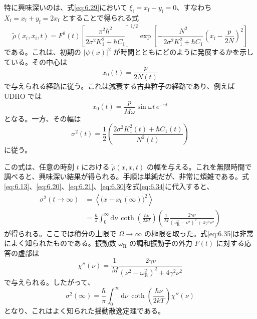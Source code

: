 特に興味深いのは、式\eqref{eq:6.29}において $\xi_{\mathrm f}=x_{\mathrm f}-y_{\mathrm f}=0$、すなわち $X_{\mathrm f}=x_{\mathrm f}+y_{\mathrm f}=2x_{\mathrm f}$ とすることで得られる式
\begin{equation}
\tilde\rho(x_{\mathrm f},x_{\mathrm f},t)
=F^2(t)\left[\frac{\pi^2\hbar^2}{2\sigma^2K_1^2+\hbar C_1}\right]^{1/2}
\exp\!\left[-\frac{N^2}{2\sigma^2K_1^2+\hbar C_1}
\left(x_{\mathrm f}-\frac p{2N}\right)^2\right]
\tag{6.31}\label{eq:6.31}
\end{equation}
である。これは、初期の $|\psi(x)|^2$ が時間とともにどのように発展するかを示している。その中心は
\begin{equation}
x_0(t)=\frac p{2N(t)}
\tag{6.32}\label{eq:6.32}
\end{equation}
で与えられる経路に従う。これは減衰する古典粒子の経路であり、例えば UDHO では
\begin{equation}
x_0(t)=\frac p{M\omega}\sin\omega t\,e^{-\gamma t}
\tag{6.33}\label{eq:6.33}
\end{equation}
となる。一方、その幅は
\begin{equation}
\sigma^2(t)=\frac12\left(\frac{2\sigma^2K_1^2(t)+\hbar C_1(t)}{N^2(t)}\right)
\tag{6.34}\label{eq:6.34}
\end{equation}
に従う。

この式は、任意の時刻 $t$ における $\tilde\rho(x,x,t)$ の幅を与える。これを無限時間で調べると、興味深い結果が得られる。手順は単純だが、非常に煩雑である。式\eqref{eq:6.13}、\eqref{eq:6.20}、\eqref{eq:6.21}、\eqref{eq:6.30}を式\eqref{eq:6.34}に代入すると、
\begin{equation}
\begin{aligned}
\sigma^2(t\to\infty)
&=\left\langle\bigl(x-x_0(\infty)\bigr)^2\right\rangle\\
&=\frac{\hbar}{\pi}\int_0^\infty\mathrm d\nu\,
\coth\!\left(\frac{\hbar\nu}{2kT}\right)
\left(\frac1M\frac{2\gamma\nu}{(\omega_{\mathrm R}^2-\nu^2)^2+4\gamma^2\nu^2}\right)
\end{aligned}
\tag{6.35}\label{eq:6.35}
\end{equation}
が得られる。ここでは積分の上限で $\Omega\to\infty$ の極限を取った。式\eqref{eq:6.35}は非常によく知られたものである。振動数 $\omega_{\mathrm R}$ の調和振動子の外力 $F(t)$ に対する応答の虚部は
\begin{equation}
\chi''(\nu)=\frac1M\frac{2\gamma\nu}{(\nu^2-\omega_{\mathrm R}^2)^2+4\gamma^2\nu^2}
\tag{6.36}\label{eq:6.36}
\end{equation}
で与えられる。したがって、
\begin{equation}
\sigma^2(\infty)=\frac{\hbar}{\pi}\int_0^\infty\mathrm d\nu\,
\coth\!\left(\frac{\hbar\nu}{2kT}\right)\chi''(\nu)
\tag{6.37}\label{eq:6.37}
\end{equation}
となり、これはよく知られた揺動散逸定理である\cite{ref32}。


